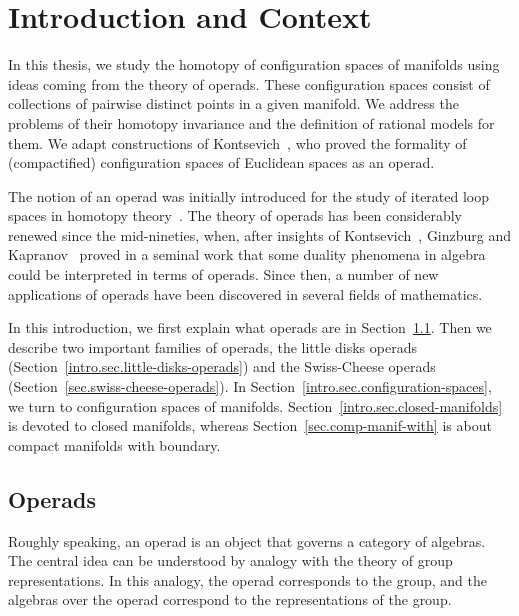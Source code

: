 \setcounter{chapter}{-1}
\chapter{Introduction and Context}
\label{chap.intro}

In this thesis, we study the homotopy of configuration spaces of manifolds using ideas coming from the theory of operads.
These configuration spaces consist of collections of pairwise distinct points in a given manifold.
We address the problems of their homotopy invariance and the definition of rational models for them.
We adapt constructions of Kontsevich~\cite{Kontsevich1999}, who proved the formality of (compactified) configuration spaces of Euclidean spaces as an operad.

The notion of an operad was initially introduced for the study of iterated loop spaces in homotopy theory~\cite{May1972,BoardmanVogt1973}.
The theory of operads has been considerably renewed since the mid-nineties, when, after insights of Kontsevich~\cite{Kontsevich1993a}, Ginzburg and Kapranov~\cite{GinzburgKapranov1994} proved in a seminal work that some duality phenomena in algebra could be interpreted in terms of operads.
Since then, a number of new applications of operads have been discovered in several fields of mathematics.

In this introduction, we first explain what operads are in Section~\ref{intro.sec.operads}.
Then we describe two important families of operads, the little disks operads (Section~\ref{intro.sec.little-disks-operads}) and the Swiss-Cheese operads (Section~\ref{sec.swiss-cheese-operads}).
In Section~\ref{intro.sec.configuration-spaces}, we turn to configuration spaces of manifolds.
Section~\ref{intro.sec.closed-manifolds} is devoted to closed manifolds, whereas Section~\ref{sec.comp-manif-with} is about compact manifolds with boundary.

\section{Operads}
\label{intro.sec.operads}

Roughly speaking, an operad is an object that governs a category of algebras.
The central idea can be understood by analogy with the theory of group representations.
In this analogy, the operad corresponds to the group, and the algebras over the operad correspond to the representations of the group.

